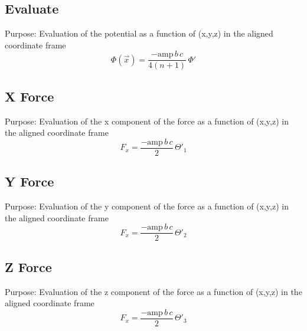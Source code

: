 \documentclass[a4paper,11pt]{article}
\begin{document}
		\subsection{Evaluate} %
			Purpose: Evaluation of the potential as a function of (x,y,z) in the aligned coordinate frame \\
   		\begin{equation}
   		\Phi(\vec{x}) = \frac{-\mathrm{amp}\,b\,c}{4(n+1)}\,\Phi'
   		\end{equation}	
	   		
	
		
		\subsection{X Force} %
			Purpose: Evaluation of the x component of the force as a function of (x,y,z) in the aligned coordinate frame \\
   		\begin{equation}
   		F_x = \frac{-\mathrm{amp}\,b\,c}{2}\,\Theta'_1
   		\end{equation}  
			

		\subsection{Y Force} %
			Purpose: Evaluation of the y component of the force as a function of (x,y,z) in the aligned coordinate frame \\
   		\begin{equation}
   		F_x = \frac{-\mathrm{amp}\,b\,c}{2}\,\Theta'_2
   		\end{equation}	
	   		
	
		
		\subsection{Z Force} %
			Purpose: Evaluation of the z component of the force as a function of (x,y,z) in the aligned coordinate frame \\
   		\begin{equation}
   		F_x = \frac{-\mathrm{amp}\,b\,c}{2}\,\Theta'_3
   		\end{equation}
	   			
	
\end{document}
